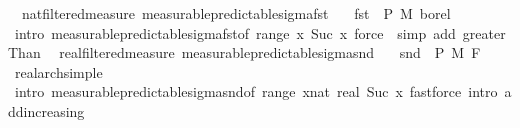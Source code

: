\begin{isabellebody}
\endisatagproof
{\isafoldproof}%
%
\isadelimproof
\isanewline
%
\endisadelimproof
\isanewline
{}\isamarkupfalse%
\ {\isacharparenleft}{\kern0pt}\ nat{\isacharunderscore}{\kern0pt}filtered{\isacharunderscore}{\kern0pt}measure{\isacharparenright}{\kern0pt}\ measurable{\isacharunderscore}{\kern0pt}predictable{\isacharunderscore}{\kern0pt}sigma{\isacharunderscore}{\kern0pt}fst{\isacharprime}{\kern0pt}{\isacharcolon}{\kern0pt}\isanewline
\ \ \ {\isachardoublequoteopen}fst\ {\isasymin}\ {\isasymSigma}\isactrlsub P\ {\isasymrightarrow}\isactrlsub M\ borel{\isachardoublequoteclose}\isanewline
%
\isadelimproof
\ \ %
\endisadelimproof
%
\isatagproof
{}\isamarkupfalse%
\ {\isacharparenleft}{\kern0pt}intro\ measurable{\isacharunderscore}{\kern0pt}predictable{\isacharunderscore}{\kern0pt}sigma{\isacharunderscore}{\kern0pt}fst{\isacharbrackleft}{\kern0pt}of\ {\isachardoublequoteopen}range\ {\isacharparenleft}{\kern0pt}{\isasymlambda}x{\isachardot}{\kern0pt}\ {\isacharbraceleft}{\kern0pt}Suc\ x{\isacharbraceright}{\kern0pt}{\isacharparenright}{\kern0pt}{\isachardoublequoteclose}{\isacharbrackright}{\kern0pt}{\isacharparenright}{\kern0pt}\ {\isacharparenleft}{\kern0pt}force\ {\isacharbar}{\kern0pt}\ simp\ add{\isacharcolon}{\kern0pt}\ greaterThan{\isacharunderscore}{\kern0pt}{}{\isacharparenright}{\kern0pt}{\isacharplus}{\kern0pt}%
\endisatagproof
{\isafoldproof}%
%
\isadelimproof
\isanewline
%
\endisadelimproof
\isanewline
{}\isamarkupfalse%
\ {\isacharparenleft}{\kern0pt}\ real{\isacharunderscore}{\kern0pt}filtered{\isacharunderscore}{\kern0pt}measure{\isacharparenright}{\kern0pt}\ measurable{\isacharunderscore}{\kern0pt}predictable{\isacharunderscore}{\kern0pt}sigma{\isacharunderscore}{\kern0pt}snd{\isacharprime}{\kern0pt}{\isacharcolon}{\kern0pt}\isanewline
\ \ \ {\isachardoublequoteopen}snd\ {\isasymin}\ {\isasymSigma}\isactrlsub P\ {\isasymrightarrow}\isactrlsub M\ F\ {}{\isachardoublequoteclose}\isanewline
%
\isadelimproof
\ \ %
\endisadelimproof
%
\isatagproof
{}\isamarkupfalse%
\ real{\isacharunderscore}{\kern0pt}arch{\isacharunderscore}{\kern0pt}simple\ \isamarkupfalse%
\ {\isacharparenleft}{\kern0pt}intro\ measurable{\isacharunderscore}{\kern0pt}predictable{\isacharunderscore}{\kern0pt}sigma{\isacharunderscore}{\kern0pt}snd{\isacharbrackleft}{\kern0pt}of\ {\isachardoublequoteopen}range\ {\isacharparenleft}{\kern0pt}{\isasymlambda}x{\isacharcolon}{\kern0pt}{\isacharcolon}{\kern0pt}nat{\isachardot}{\kern0pt}\ {\isacharbraceleft}{\kern0pt}{}{\isacharless}{\kern0pt}{\isachardot}{\kern0pt}{\isachardot}{\kern0pt}real\ {\isacharparenleft}{\kern0pt}Suc\ x{\isacharparenright}{\kern0pt}{\isacharbraceright}{\kern0pt}{\isacharparenright}{\kern0pt}{\isachardoublequoteclose}{\isacharbrackright}{\kern0pt}{\isacharparenright}{\kern0pt}\ {\isacharparenleft}{\kern0pt}fastforce\ intro{\isacharcolon}{\kern0pt}\ add{\isacharunderscore}{\kern0pt}increasing{\isacharparenright}{\kern0pt}{\isacharplus}{\kern0pt}%

\end{isabellebody}
